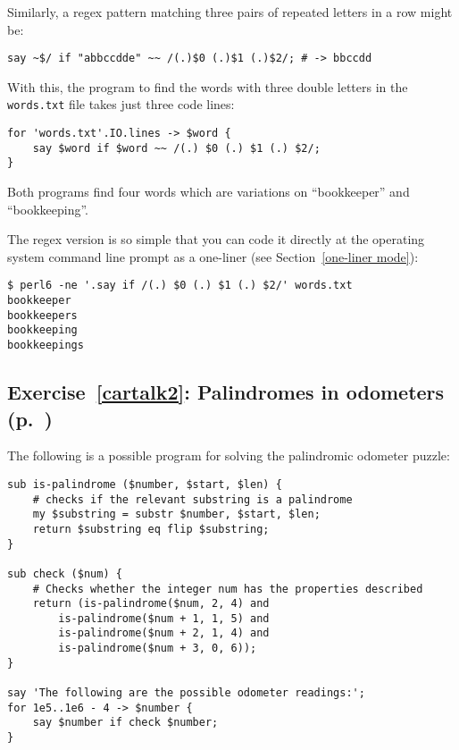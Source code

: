 Similarly, a regex pattern matching three pairs of repeated 
letters in a row might be:
\begin{verbatim}
say ~$/ if "abbccdde" ~~ /(.)$0 (.)$1 (.)$2/; # -> bbccdd 
\end{verbatim}

With this, the program to find the words with three double 
letters in the {\tt words.txt} file takes just three code 
lines:

\begin{verbatim}
for 'words.txt'.IO.lines -> $word {
    say $word if $word ~~ /(.) $0 (.) $1 (.) $2/;
}
\end{verbatim}
%

Both programs find four words which are variations on 
``bookkeeper'' and ``bookkeeping''.

The regex version is so simple that you can code it directly 
at the operating system command line prompt as a one-liner (see Section~\ref{one-liner mode}):

\begin{verbatim}
$ perl6 -ne '.say if /(.) $0 (.) $1 (.) $2/' words.txt
bookkeeper
bookkeepers
bookkeeping
bookkeepings
\end{verbatim}


\subsection{Exercise~\ref{cartalk2}: Palindromes in odometers (p.~\pageref{cartalk2})}
\label{sol_cartalk2}

The following is a possible program for solving the 
palindromic odometer puzzle:

\begin{verbatim}
sub is-palindrome ($number, $start, $len) {
    # checks if the relevant substring is a palindrome
    my $substring = substr $number, $start, $len;
    return $substring eq flip $substring;
}
    
sub check ($num) {
    # Checks whether the integer num has the properties described
    return (is-palindrome($num, 2, 4) and
        is-palindrome($num + 1, 1, 5) and
        is-palindrome($num + 2, 1, 4) and
        is-palindrome($num + 3, 0, 6));
}

say 'The following are the possible odometer readings:';
for 1e5..1e6 - 4 -> $number {
    say $number if check $number;
}
\end{verbatim}

